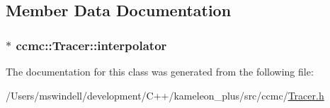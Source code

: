 \subsection{Member Data Documentation}
\hypertarget{classccmc_1_1_tracer_ae7a4953e9ca43eb93535b869864f6062}{
\subsubsection[{interpolator}]{$\ast$ ccmc\-::\-Tracer\-::interpolator}}\label{classccmc_1_1_tracer_ae7a4953e9ca43eb93535b869864f6062}


The documentation for this class was generated from the following file\-:\begin{DoxyCompactItemize}
\item 
/\-Users/mswindell/development/\-C++/kameleon\-\_\-plus/src/ccmc/\hyperlink{_tracer_8h}{Tracer.\-h}\end{DoxyCompactItemize}
